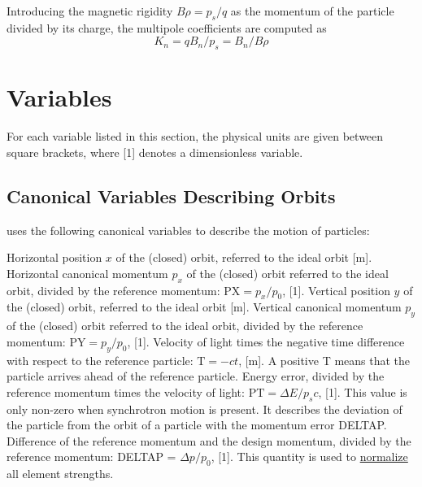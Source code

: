Introducing the magnetic rigidity \(B \rho = p_s / q\) as the
momentum of the particle divided by its charge, the multipole
coefficients are computed as
\begin{equation}
K_n = q B_n / p_s  =  B_n / B \rho 
\end{equation}



\section{Variables}
\label{sec:variables}

For each variable listed in this section, the physical units are given
between square brackets, where [1] denotes a dimensionless variable.

\subsection{Canonical Variables Describing Orbits}
\label{subsec:tables_canon}
\madx uses the following canonical variables to describe the motion of particles: 
\begin{madlist}
    Horizontal position $x$ of the (closed) orbit,
     referred to the ideal orbit [m].    
    Horizontal canonical momentum $p_x$ of the
     (closed) orbit referred to the ideal orbit, divided by the
     reference momentum: $\textrm{PX} = p_x / p_0$, [1].   
    Vertical position $y$ of the (closed) orbit, referred
     to the ideal orbit [m].   
    Vertical canonical momentum $p_y$ of the (closed)
     orbit referred to the ideal orbit, divided by the reference
     momentum: $\textrm{PY} = p_y / p_0$, [1].   
    Velocity of light times the negative time difference with
     respect to the reference particle: $\textrm{T} =  - c t$, [m]. A
     positive T means that the particle arrives ahead of the reference
     particle.   
    Energy error, divided by the reference momentum times the
     velocity of light: $\textrm{PT} = \Delta E / p_s c$, [1]. 
     This value is only non-zero when synchrotron motion is
     present. It describes the deviation of the particle from the orbit
     of a particle with the momentum error DELTAP.   
    Difference of the reference momentum and the design
     momentum, divided by the reference momentum: DELTAP =
     $\Delta p / p_0$, [1]. This quantity is used to
     \hyperref[chap:differences]{normalize} all element strengths.   
\end{madlist} 

